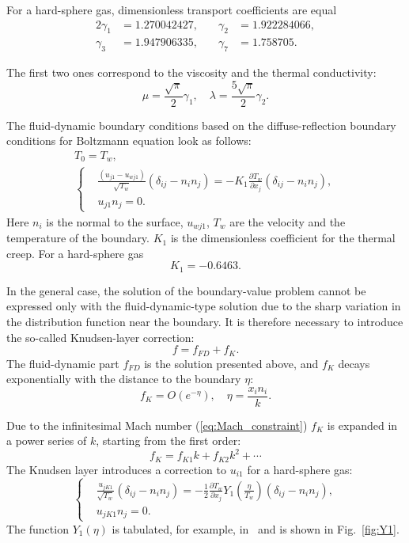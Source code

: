 \documentclass[smallextended, referee]{svjour3} %
\newcommand{\pder}[2][]{\frac{\partial#1}{\partial#2}}
\begin{document}
For a hard-sphere gas, dimensionless transport coefficients are equal
\begin{alignat*}{2}
	\gamma_1 &= 1.270042427, &\quad \gamma_2 &= 1.922284066, \\
	\gamma_3 &= 1.947906335, &\quad \gamma_7 &= 1.758705.
\end{alignat*}

The first two ones correspond to the viscosity and the thermal conductivity:
\[ \mu = \frac{\sqrt\pi}2\gamma_1, \quad \lambda = \frac{5\sqrt\pi}2\gamma_2. \]

The fluid-dynamic boundary conditions based on the diffuse-reflection boundary conditions
for Boltzmann equation look as follows:
\begin{gather}
	T_0 = T_w, \label{eq:bound:T} \\
	\left\{
	\begin{aligned}
		& \frac{(u_{j1}-u_{wj1})}{\sqrt{T_w}}(\delta_{ij}-n_in_j) = 
			-K_1\pder[T_w]{x_j}(\delta_{ij}-n_in_j), \\
		& u_{j1}n_j = 0.
	\end{aligned}
	\right. \label{eq:bound:v}
\end{gather}
Here \(n_i\) is the normal to the surface, \(u_{wj1}\), \(T_w\) are the velocity and the temperature of the boundary.
\(K_1\) is the dimensionless coefficient for the thermal creep. For a hard-sphere gas
\[ K_1 = -0.6463. \]

In the general case, the solution of the boundary-value problem cannot be expressed only
with the fluid-dynamic-type solution due to the sharp variation in the distribution function
near the boundary.
It is therefore necessary to introduce the so-called Knudsen-layer correction:
\begin{equation}
	f = f_{FD} + f_K.
\end{equation}
The fluid-dynamic part \(f_{FD}\) is the solution presented above,
and \(f_K\) decays exponentially with the distance to the boundary \(\eta\):
\begin{equation}
	f_K = O\left(e^{-\eta}\right), \quad \eta = \frac{x_in_i}k.
\end{equation}

Due to the infinitesimal Mach number (\ref{eq:Mach_constraint}) \(f_K\) is expanded
in a power series of \(k\), starting from the first order:
\[ f_K = f_{K1} k + f_{K2} k ^ 2 + \cdots \]
The Knudsen layer introduces a correction to \(u_{i1}\) for a hard-sphere gas:
\begin{equation}
	\left\{
	\begin{aligned}
		& \frac{u_{jK1}}{\sqrt{T_w}}(\delta_{ij}-n_in_j) = 
			-\frac12\pder[T_w]{x_j} Y_1\left(\frac\eta{T_w}\right) (\delta_{ij}-n_in_j), \\
		& u_{jK1}n_j = 0.
	\end{aligned}
	\right. \label{eq:bound:v_K}
\end{equation}
The function \(Y_1(\eta)\) is tabulated, for example, in~\cite{Sone2002, Sone2007} and is shown in Fig.~\ref{fig:Y1}.
\end{document}
